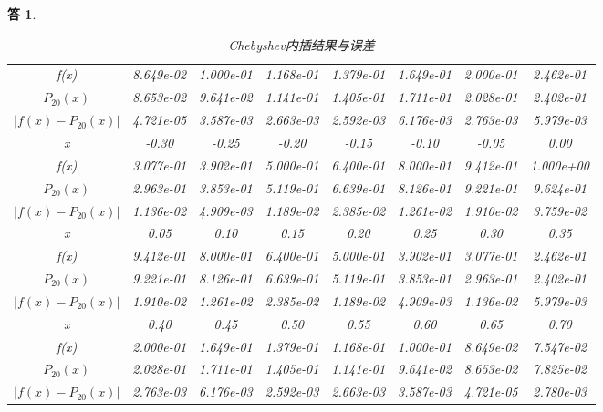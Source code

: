 \documentclass[10pt]{ctexart}
\newtheorem*{answer}{答}
\begin{document}
\begin{answer}
\begin{table}[H]
\begin{tabular}{cccccccc}
            \midrule
            f(x) & 8.649e-02 & 1.000e-01 & 1.168e-01 & 1.379e-01 & 1.649e-01 & 2.000e-01 & 2.462e-01 \\
            $P_{20}(x)$ & 8.653e-02 & 9.641e-02 & 1.141e-01 & 1.405e-01 & 1.711e-01 & 2.028e-01 & 2.402e-01  \\
            $\lvert f(x)-P_{20}(x)\rvert$ & 4.721e-05 & 3.587e-03 &  2.663e-03 & 2.592e-03 & 6.176e-03 &2.763e-03 & 5.979e-03 \\
            \bottomrule
            \toprule
            x & -0.30 & -0.25 & -0.20 & -0.15 & -0.10 & -0.05 & 0.00 \\
            \midrule
            f(x) &  3.077e-01 & 3.902e-01  & 5.000e-01 & 6.400e-01 & 8.000e-01 & 9.412e-01 & 1.000e+00 \\
            $P_{20}(x)$ &  2.963e-01 & 3.853e-01& 5.119e-01 & 6.639e-01 & 8.126e-01 & 9.221e-01 &  9.624e-01  \\
            $\lvert f(x)-P_{20}(x)\rvert$ & 1.136e-02 & 4.909e-03& 1.189e-02 &  2.385e-02 & 1.261e-02 & 1.910e-02 & 3.759e-02\\
            \bottomrule
            \toprule
            x & 0.05 & 0.10 & 0.15 & 0.20 & 0.25 & 0.30 & 0.35 \\
            \midrule
            f(x) &  9.412e-01 & 8.000e-01  & 6.400e-01 & 5.000e-01 & 3.902e-01 & 3.077e-01 & 2.462e-01 \\
            $P_{20}(x)$ &  9.221e-01 & 8.126e-01& 6.639e-01 & 5.119e-01 & 3.853e-01 & 2.963e-01 & 2.402e-01\\
            $\lvert f(x)-P_{20}(x)\rvert$ & 1.910e-02 & 1.261e-02& 2.385e-02 & 1.189e-02 & 4.909e-03 & 1.136e-02 & 5.979e-03\\
            \bottomrule
            \toprule
            x & 0.40 & 0.45 & 0.50 & 0.55 & 0.60 & 0.65 & 0.70 \\
            \midrule
            f(x) &  2.000e-01 & 1.649e-01  & 1.379e-01& 1.168e-01  &  1.000e-01 &8.649e-02 &7.547e-02\\
            $P_{20}(x)$ &  2.028e-01 & 1.711e-01 & 1.405e-01 & 1.141e-01& 9.641e-02 & 8.653e-02& 7.825e-02\\
            $\lvert f(x)-P_{20}(x)\rvert$ & 2.763e-03& 6.176e-03& 2.592e-03 & 2.663e-03& 3.587e-03 & 4.721e-05 & 2.780e-03\\
            \bottomrule
        \end{tabular}
        \caption{Chebyshev内插结果与误差}
    \end{table}
    \begin{table}

\end{table}
\end{answer}
\end{document}
